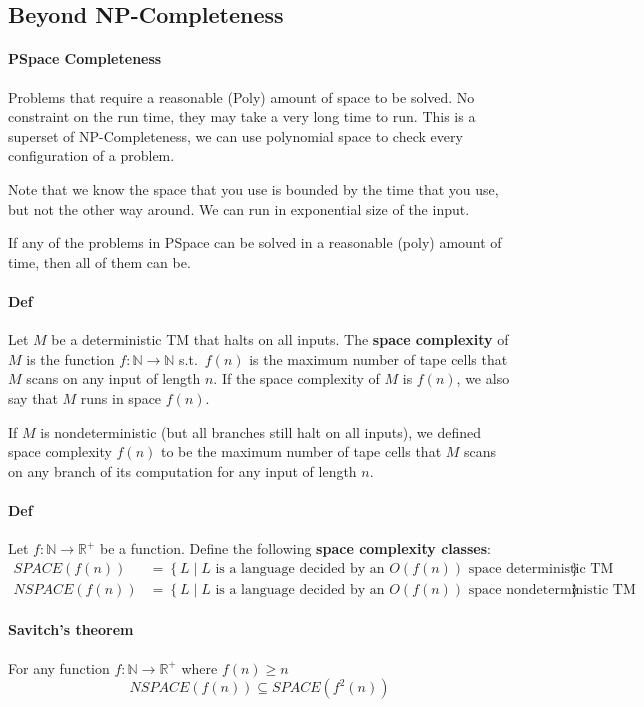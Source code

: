 \documentclass[12 pt]{article}
\begin{document}
\subsection{Beyond NP-Completeness}
\paragraph{PSpace Completeness} Problems that require a reasonable
(Poly) amount of space to be solved. No constraint on the run time,
they may take a very long time to run. This is a superset of
NP-Completeness, we can use polynomial space to check every
configuration of a problem.

Note that we know the space that you use is bounded by the time that
you use, but not the other way around. We can run in exponential size
of the input.

If any of the problems in PSpace can be solved in a reasonable (poly)
amount of time, then all of them can be.

\paragraph{Def} Let $M$ be a deterministic TM that halts on all
inputs. The \textbf{space complexity} of $M$ is the function $f:
\mathbb{N} \to \mathbb{N}$ s.t.\ $f(n)$ is the maximum number of tape
cells that $M$ scans on any input of length $n$. If the space
complexity of $M$ is $f(n)$, we also say that $M$ runs in space
$f(n)$.

If $M$ is nondeterministic (but all branches still halt on all
inputs), we defined space complexity $f(n)$ to be the maximum number
of tape cells that $M$ scans on any branch of its computation for any
input of length $n$.

\paragraph{Def} Let $f: \mathbb{N} \to \mathbb{R}^+$ be a
function. Define the following
\textbf{space complexity classes}:
\begin{align*}
  SPACE(f(n)) & = \left\{L \mid L \text{ is a language decided by an
                $O(f(n))$ space deterministic TM}\right\}
  \\ NSPACE(f(n)) & = \left\{L \mid L \text{ is a language decided by an
                $O(f(n))$ space nondeterministic TM}\right\}
\end{align*}
\paragraph{Savitch's theorem} For any function $f: \mathbb{N} \to
\mathbb{R}^+$ where $f(n) \geq n$
$$NSPACE(f(n)) \subseteq SPACE(f^2(n))$$
\end{document}
